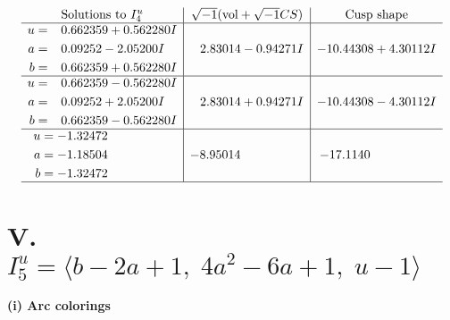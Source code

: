 \documentclass[1p]{elsarticle_modified}
\theoremstyle{definition}
\newcommand{\I}{\sqrt{-1}}
\begin{document}
$$\begin{array}{c|c|c}  
\text{Solutions to }I^u_{4}& \I (\text{vol} + \sqrt{-1}CS) & \text{Cusp shape}\\
 \hline 
\begin{aligned}
u &= \phantom{-}0.662359 + 0.562280 I \\
a &= \phantom{-}0.09252 - 2.05200 I \\
b &= \phantom{-}0.662359 + 0.562280 I\end{aligned}
 & \phantom{-}2.83014 - 0.94271 I & -10.44308 + 4.30112 I \\ \hline\begin{aligned}
u &= \phantom{-}0.662359 - 0.562280 I \\
a &= \phantom{-}0.09252 + 2.05200 I \\
b &= \phantom{-}0.662359 - 0.562280 I\end{aligned}
 & \phantom{-}2.83014 + 0.94271 I & -10.44308 - 4.30112 I \\ \hline\begin{aligned}
u &= -1.32472\phantom{ +0.000000I} \\
a &= -1.18504\phantom{ +0.000000I} \\
b &= -1.32472\phantom{ +0.000000I}\end{aligned}
 & -8.95014\phantom{ +0.000000I} & -17.1140\phantom{ +0.000000I}\\
 \hline 
 \end{array}$$\newpage\newpage\renewcommand{\arraystretch}{1}
\centering \section*{V. $I^u_{5}= \langle b-2 a+1,\;4 a^2-6 a+1,\;u-1 \rangle$}
\flushleft \textbf{(i) Arc colorings}\\
\end{document}
